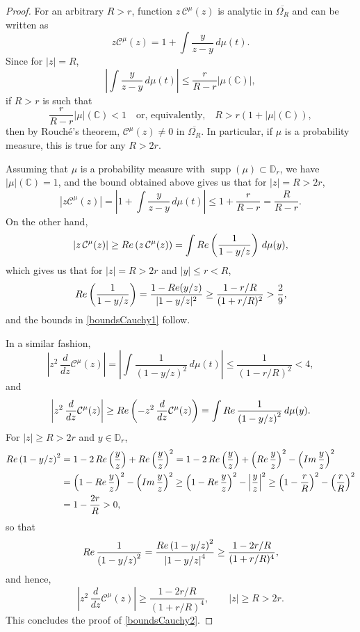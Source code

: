 \documentclass[reqno,11pt]{amsart}
\theoremstyle{plain}
\theoremstyle{definition}
\theoremstyle{remark}
\numberwithin{equation}{section}
\numberwithin{equation}{section}
\renewcommand{\Re}{\mathop{\rm Re}}
\renewcommand{\Im}{\mathop{\rm Im}}
\DeclareMathOperator{\supp}{supp}
\newcommand{\C}{\mathbb{C}}
\newcommand{\D}{\mathbb{D}}
\begin{document}
\begin{proof}
For an arbitrary $R>r$, function $z\, \mathcal C^\mu(z)$ is analytic in $\overline{\Omega_R}$ and can be written as
$$
z\mathcal C^\mu(z) = 1 +    \int \frac{y}{z-y}\, d\mu(t).
$$
Since for $|z|=R$,
$$
\left| \int \frac{y}{z-y}\, d\mu(t)\right|\le \frac{r}{R-r}|\mu(\C)|,
$$
if $R>r$ is such that 
 $$
	\frac{r}{R- r} |\mu|(\C)<1 \quad \text{or, equivalently,} \quad    R>r (1+|\mu|(\C)),
	$$
then by Rouch\'e's theorem, $\mathcal C^\mu(z)\ne 0$ in $\overline{\Omega_{R}}$. 
In particular, if $\mu$ is a probability measure, this is true for any $R>2r$. 

Assuming that $\mu$ is a probability measure with $\supp (\mu) \subset\D_r$, we have $ |\mu|(\C)=1$, and the bound obtained above gives us that for $|z|=R>2r$,
$$
\left| z\mathcal C^\mu(z) \right| =\left| 1 +    \int \frac{y}{z-y}\, d\mu(t)\right| \le 1 + \frac{r}{R-r}=\frac{R}{R-r}.
$$
On the other hand,
$$
\left| z \, \mathcal C^\mu(z)\right| \ge \Re \left( z\,  \mathcal C^\mu(z)\right) = \int \Re \left(\frac{1}{1-y/z} \right)\, d\mu(y),
$$
which gives us that for $|z|=R>2r$ and $|y|\le r<R$,
$$
\Re \left(\frac{1}{1-y/z} \right) =\frac{1-\Re (y/z)}{|1-y/z|^2}  \ge \frac{1-r/R}{(1+r/R)^2}>\frac{2}{9},
$$
and the bounds in \eqref{boundsCauchy1} follow. 

In a similar fashion,
$$
\left| z^2 \,\frac{d}{dz} \mathcal C^\mu(z)\right| = \left|  \int \frac{1}{(1-y/z)^2}\, d\mu(t) \right| \le  \frac{1}{(1-r/R)^2} <4,
$$
and
$$
\left| z^2 \,\frac{d}{dz}  \mathcal C^\mu(z)\right| \ge \Re \left( -z^2 \,\frac{d}{dz}  \mathcal C^\mu(z)\right) = \int \Re \frac{1}{\left(1-y/z\right)^2} \, d\mu(y).
$$
For $|z|\ge R>2r$ and $y\in\D_r$, 
\begin{align*}
\Re   \left(1-y/z\right)^2  & = 1- 2\Re \left(\frac{y}{z}\right) + \Re \left(\frac{y}{z}\right)^2 = 1- 2\Re \left(\frac{y}{z}\right) + \left(\Re 
 \frac{y}{z}\right)^2 - \left(\Im 
 \frac{y}{z}\right)^2 \\
 & = \left(1- \Re 
 \frac{y}{z}\right)^2 - \left(\Im 
 \frac{y}{z}\right)^2\ge \left(1- \Re 
 \frac{y}{z}\right)^2 -\left|
 \frac{y}{z}\right|^2\ge \left(1- \frac{r}{R}\right)^2 -\left(
 \frac{r}{R}\right)^2 \\
 & = 1-   \frac{2r}{R} >0,
\end{align*}
so that
$$
\Re   \frac{1}{\left(1-y/z\right)^2} = \frac{\Re   \left(1-y/z\right)^2}{\left|1-y/z\right|^4} \ge \frac{1-2r/R}{(1+r/R)^4},
$$
and hence,
$$
\left| z^2 \,\frac{d}{dz}  \mathcal C^\mu(z)\right| \ge  \frac{1-2r/R}{(1+r/R)^4},\qquad |z|\ge R>2r.
$$
This concludes the proof of \eqref{boundsCauchy2}.


\end{proof}
\end{document}
